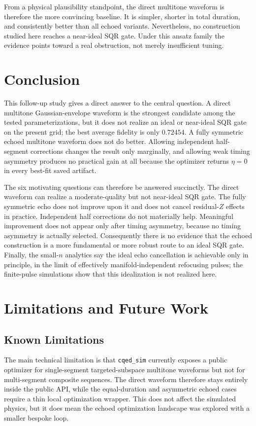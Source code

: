 \documentclass[aps,pra,twocolumn,reprint,floatfix,amsmath,amssymb]{revtex4-2}
\begin{document}
From a physical plausibility standpoint, the direct multitone waveform is therefore the more convincing baseline. It is simpler, shorter in total duration, and consistently better than all echoed variants. Nevertheless, no construction studied here reaches a near-ideal SQR gate. Under this ansatz family the evidence points toward a real obstruction, not merely insufficient tuning.

\section{Conclusion}
This follow-up study gives a direct answer to the central question. A direct multitone Gaussian-envelope waveform is the strongest candidate among the tested parameterizations, but it does not realize an ideal or near-ideal SQR gate on the present grid; the best average fidelity is only $0.72454$. A fully symmetric echoed multitone waveform does not do better. Allowing independent half-segment corrections changes the result only marginally, and allowing weak timing asymmetry produces no practical gain at all because the optimizer returns $\eta=0$ in every best-fit saved artifact.

The six motivating questions can therefore be answered succinctly. The direct waveform can realize a moderate-quality but not near-ideal SQR gate. The fully symmetric echo does not improve upon it and does not cancel residual-$Z$ effects in practice. Independent half corrections do not materially help. Meaningful improvement does not appear only after timing asymmetry, because no timing asymmetry is actually selected. Consequently there is no evidence that the echoed construction is a more fundamental or more robust route to an ideal SQR gate. Finally, the small-$n$ analytics say the ideal echo cancellation is achievable only in principle, in the limit of effectively manifold-independent refocusing pulses; the finite-pulse simulations show that this idealization is not realized here.

\section{Limitations and Future Work}

\subsection{Known Limitations}
The main technical limitation is that \texttt{cqed\_sim} currently exposes a public optimizer for single-segment targeted-subspace multitone waveforms but not for multi-segment composite sequences. The direct waveform therefore stays entirely inside the public API, while the equal-duration and asymmetric echoed cases require a thin local optimization wrapper. This does not affect the simulated physics, but it does mean the echoed optimization landscape was explored with a smaller bespoke loop.
\end{document}
